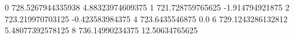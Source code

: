 0 728.5267944335938 4.88323974609375
1 721.728759765625 -1.914794921875
2 723.219970703125 -0.423583984375
4 723.6435546875 0.0
6 729.1243286132812 5.48077392578125
8 736.14990234375 12.50634765625
